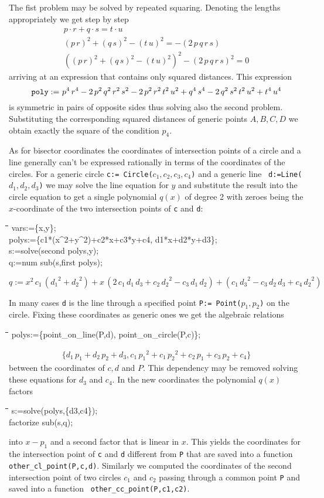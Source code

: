 \documentclass{article}
\newenvironment{code}{\tt \begin{tabbing}
\hspace*{1cm}\=\hspace*{1cm}\=\hspace*{1cm}\=
\hspace*{1cm}\=\hspace*{1cm}\=\kill
}{\end{tabbing}}
\newcommand{\formel}[1]{\[\begin{array}{l} #1\end{array}\]}
\begin{document}
The fist problem may be solved by repeated squaring. Denoting the
lengths appropriately we get step by step
\[\begin{array}{c}
p\cdot r + q\cdot s = t\cdot u\\
(p\,r)^2+(q\,s)^2-(t\,u)^2 = -(2\,p\,q\,r\,s)\\
((p\,r)^2+(q\,s)^2-(t\,u)^2)^2 - (2\,p\,q\,r\,s)^2 = 0
\end{array}\]
arriving at an expression that contains only squared distances. This
expression 
\[{\tt poly:= }\ p^4\,r^4 - 2\,p^2\,q^2\,r^2\,s^2 -
2\,p^2\,r^2\,t^2\,u^2 + q^4\,s^4 - 2\,q^2\, s ^2\,t^2\,u^2 + t^4\,u^4
\] 
is symmetric in pairs of opposite sides thus solving also the second
problem. Substituting the corresponding squared distances of generic
points $A,B,C,D$ we obtain exactly the square of the condition $p_4$. 
\medskip

As for bisector coordinates the coordinates of intersection points of
a circle and a line generally can't be expressed rationally in terms
of the coordinates of the circles. For a generic circle {\tt c:=
Circle($c_1,c_2,c_3,c_4$)} and a generic line {\tt
d:=Line($d_1,d_2,d_3$)} we may solve the line equation for $y$ and
substitute the result into the circle equation to get a single
polynomial $q(x)$ of degree 2 with zeroes being the $x$-coordinate of
the two intersection points of {\tt c} and {\tt d}:
\begin{code}\>\+
vars:=\{x,y\};\\
polys:=\{c1*(x\^{}2+y\^{}2)+c2*x+c3*y+c4, d1*x+d2*y+d3\};\\
s:=solve(second polys,y);\\
q:=num sub(s,first polys);
\end{code}
$q:={x}^{2}\,c_1\,({d_1}^{2} +{d_2}^{2}) +x\,(2\,c_1\,d_1\,d_3 +
c_2\,{d_2}^{2} -c_3\,d_1\,d_2 ) +(c_1\,{d_3}^{2} -c_3\,d_2\,d_3
+c_4\,{d_2}^{2})$
\medskip

In many cases {\tt d} is the line through a specified point {\tt P:=
Point($p_1,p_2$)} on the circle. Fixing these coordinates as generic
ones we get the algebraic relations
\begin{code}\>
polys:=\{point\_on\_line(P,d), point\_on\_circle(P,c)\};
\end{code}
\formel{\{d_1\,p_1 +d_2\,p_2 +d_3, c_1\,{p_1}^{2} +c_1\,{p_2}^{2}
 +c_2\,p_1 +c_3\,p_2 +c_4\}}
between the coordinates of $c, d$ and $P$. This dependency may be
removed solving these equations for $d_3$ and $c_4$. In the new
coordinates the polynomial $q(x)$ factors
\begin{code}\>\+
s:=solve(polys,\{d3,c4\});\\
factorize sub(s,q);
\end{code}
into $x-p_1$ and a second factor that is linear in $x$. This yields
the coordinates for the intersection point of {\tt c} and {\tt d}
different from {\tt P} that are saved into a function {\tt
other\_cl\_point(P,c,d)}. Similarly we computed the coordinates of the
second intersection point of two circles $c_1$ and $c_2$ passing
through a common point {\tt P} and saved into a function {\tt
other\_cc\_point(P,c1,c2)}. 
\end{document}
